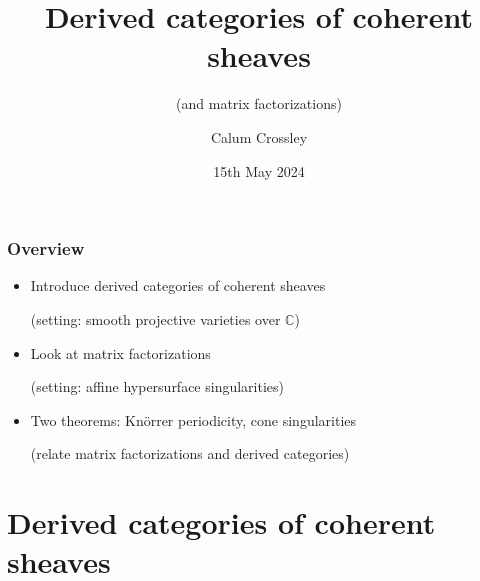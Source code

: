 \documentclass{beamer}
\title{Derived categories of coherent sheaves}
\subtitle{(and matrix factorizations)}
\date{15th May 2024}
\author{Calum Crossley}
\newcommand{\C}{\mathbb{C}}
\begin{document}
\begin{frame}
    \titlepage
\end{frame}

\begin{frame}
    \frametitle{Overview}

    \begin{itemize}
        \item Introduce derived categories of coherent sheaves

            (setting: smooth projective varieties over $\C$) \pause

        \item Look at matrix factorizations

            (setting: affine hypersurface singularities) \pause

        \item Two theorems: Kn\"orrer periodicity, cone singularities

            (relate matrix factorizations and derived categories)
    \end{itemize}
\end{frame}

\section{Derived categories of coherent sheaves}
\end{document}
